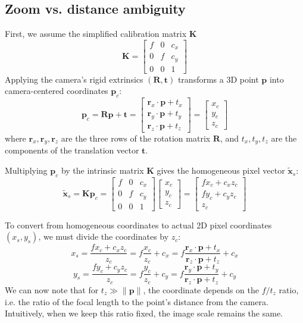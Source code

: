 \subsection{Zoom vs. distance ambiguity}
First, we assume the simplified calibration matrix $\mathbf{K}$
$$\mathbf{K} = \begin{bmatrix} f & 0 & c_x \\ 0 & f & c_y \\ 0 & 0 & 1 \end{bmatrix}$$
Applying the camera's rigid extrinsics $(\mathbf{R}, \mathbf{t})$ transforms a 3D point $\mathbf{p}$ into camera-centered coordinates $\mathbf{p}_c$:
$$\mathbf{p}_c = \mathbf{R}\mathbf{p} + \mathbf{t} = \begin{bmatrix} \mathbf{r}_x \cdot \mathbf{p} + t_x \\ \mathbf{r}_y \cdot \mathbf{p} + t_y \\ \mathbf{r}_z \cdot \mathbf{p} + t_z \end{bmatrix} = \begin{bmatrix} x_c \\ y_c \\ z_c \end{bmatrix}$$
where $\mathbf{r}_x, \mathbf{r}_y, \mathbf{r}_z$ are the three rows of the rotation matrix $\mathbf{R}$, and $t_x, t_y, t_z$ are the components of the translation vector $\mathbf{t}$.

Multiplying $\mathbf{p}_c$ by the intrinsic matrix $\mathbf{K}$ gives the homogeneous pixel vector $\tilde{\mathbf{x}}_s$:
$$\tilde{\mathbf{x}}_s = \mathbf{K} \mathbf{p}_c = \begin{bmatrix} f & 0 & c_x \\ 0 & f & c_y \\ 0 & 0 & 1 \end{bmatrix} \begin{bmatrix} x_c \\ y_c \\ z_c \end{bmatrix} = \begin{bmatrix} f x_c + c_x z_c \\ f y_c + c_y z_c \\ z_c \end{bmatrix}$$

To convert from homogeneous coordinates to actual 2D pixel coordinates $(x_s, y_s)$, we must divide the coordinates by $z_{c}$:
$$x_s = \frac{f x_c + c_x z_c}{z_c} = f \frac{x_c}{z_c} + c_x = f \frac{\mathbf{r}_x \cdot \mathbf{p} + t_x}{\mathbf{r}_z \cdot \mathbf{p} + t_z} + c_x$$
$$y_s = \frac{f y_c + c_y z_c}{z_c} = f \frac{y_c}{z_c} + c_y = f \frac{\mathbf{r}_y \cdot \mathbf{p} + t_y}{\mathbf{r}_z \cdot \mathbf{p} + t_z} + c_y$$
We can now note that for $t_{z} \gg \| \mathbf{p} \|$, the coordinate depends on the $f / t_{z}$ ratio, i.e. the ratio of the focal length to the point's distance from the camera. Intuitively, when we keep this ratio fixed, the image scale remains the same.

